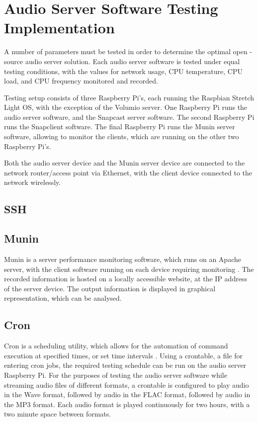 \documentclass[11pt,a4paper]{scrreprt}
\begin{document}
\section{Audio Server Software Testing
Implementation}\label{audio-server-software-testing-implementation}

A number of parameters must be tested in order to determine the optimal
open -source audio server solution. Each audio server software is tested
under equal testing conditions, with the values for network usage, CPU
temperature, CPU load, and CPU frequency monitored and recorded.

Testing setup consists of three Raspberry Pi's, each running the
Raspbian Stretch Light OS, with the exception of the Volumio server. One
Raspberry Pi runs the audio server software, and the Snapcast server
software. The second Raspberry Pi runs the Snapclient software. The
final Raspberry Pi runs the Munin server software, allowing to monitor
the clients, which are running on the other two Raspberry Pi's.

Both the audio server device and the Munin server device are connected
to the network router/access point via Ethernet, with the client device
connected to the network wirelessly.

\subsection{SSH}\label{ssh}

\subsection{Munin}\label{munin}

Munin is a server performance monitoring software, which runs on an
Apache server, with the client software running on each device requiring
monitoring \cite{MuninMonitoring}. The recorded information is hosted on
a locally accessible website, at the IP address of the server device.
The output information is displayed in graphical representation, which
can be analysed.

\subsection{Cron}\label{cron}

Cron is a scheduling utility, which allows for the automation of command
execution at specified times, or set time intervals \cite{crontab}.
Using a crontable, a file for entering cron jobs, the required testing
schedule can be run on the audio server Raspberry Pi. For the purposes
of testing the audio server software while streaming audio files of
different formats, a crontable is configured to play audio in the Wave
format, followed by audio in the FLAC format, followed by audio in the
MP3 format. Each audio format is played continuously for two hours, with
a two minute space between formats.
\end{document}
